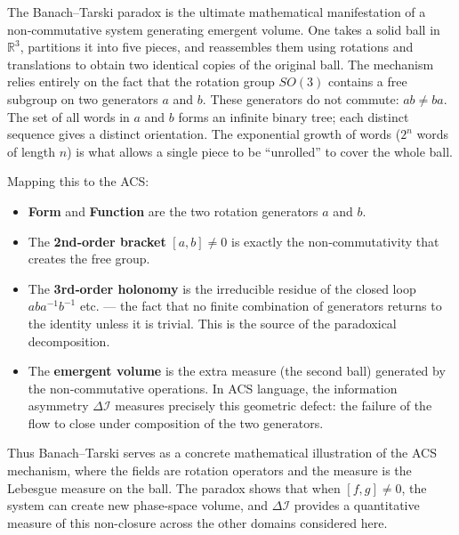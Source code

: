 \documentclass[11pt,a4paper]{article}
\theoremstyle{plain}
\theoremstyle{definition}
\theoremstyle{remark}
\newcommand{\DI}{\Delta\mathcal{I}}
\begin{document}
The Banach–Tarski paradox is the ultimate mathematical manifestation of a non‑commutative
system generating emergent volume.  One takes a solid ball in $\mathbb{R}^3$, partitions it
into five pieces, and reassembles them using rotations and translations to obtain two
identical copies of the original ball.  The mechanism relies entirely on the fact that
the rotation group $SO(3)$ contains a free subgroup on two generators $a$ and $b$.
These generators do not commute: $ab \neq ba$.  The set of all words in $a$ and $b$ forms
an infinite binary tree; each distinct sequence gives a distinct orientation.
The exponential growth of words ($2^n$ words of length $n$) is what allows a single piece
to be “unrolled” to cover the whole ball.

Mapping this to the ACS:
\begin{itemize}[noitemsep]
  \item \textbf{Form} and \textbf{Function} are the two rotation generators $a$ and $b$.
  \item The \textbf{2nd‑order bracket} $[a,b] \neq 0$ is exactly the non‑commutativity that
    creates the free group.
  \item The \textbf{3rd‑order holonomy} is the irreducible residue of the closed loop
    $a b a^{-1} b^{-1}$ etc. — the fact that no finite combination of generators returns
    to the identity unless it is trivial.  This is the source of the paradoxical decomposition.
  \item The \textbf{emergent volume} is the extra measure (the second ball) generated by
    the non‑commutative operations.  In ACS language, the information asymmetry $\DI$
    measures precisely this geometric defect: the failure of the flow to close under
    composition of the two generators.
\end{itemize}

Thus Banach--Tarski serves as a concrete mathematical illustration of the ACS
mechanism, where the fields are rotation operators and the measure is the Lebesgue
measure on the ball.  The paradox shows that when $[f,g] \neq 0$, the system can
create new phase-space volume, and $\DI$ provides a quantitative measure of this
non-closure across the other domains considered here.

\end{document}
